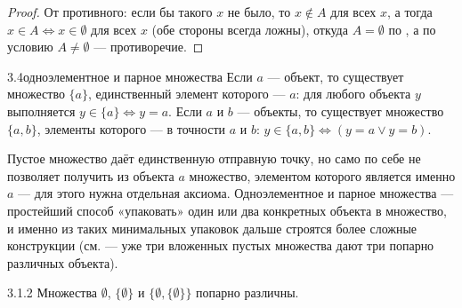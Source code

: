 \begin{proof}
От противного: если бы такого $x$ не было, то $x \notin A$ для всех $x$, а тогда
$x \in A \iff x \in \emptyset$ для всех $x$ (обе стороны всегда ложны), откуда $A=\emptyset$
по , а по условию $A \neq \emptyset$ — противоречие.
\end{proof}

\begin{axiom}{3.4}{одноэлементное и парное множества}
Если $a$ — объект, то существует множество $\{a\}$, единственный элемент которого — $a$:
для любого объекта $y$ выполняется $y \in \{a\} \iff y=a$. Если $a$ и $b$ — объекты, то
существует множество $\{a,b\}$, элементы которого — в точности $a$ и $b$:
$y \in \{a,b\} \iff (y=a \lor y=b)$.
\end{axiom}

\begin{intuition}
Пустое множество даёт единственную отправную точку, но само по себе не позволяет получить
из объекта $a$ множество, элементом которого является именно $a$ — для этого нужна отдельная
аксиома. Одноэлементное и парное множества — простейший способ «упаковать» один или два
конкретных объекта в множество, и именно из таких минимальных упаковок дальше строятся более
сложные конструкции (см.  — уже три вложенных пустых
множества дают три попарно различных объекта).

\begin{center}
\end{center}
\end{intuition}

\begin{exercise}{3.1.2}{}
Множества $\emptyset$, $\{\emptyset\}$ и $\{\emptyset,\{\emptyset\}\}$ попарно различны.
\end{exercise}

